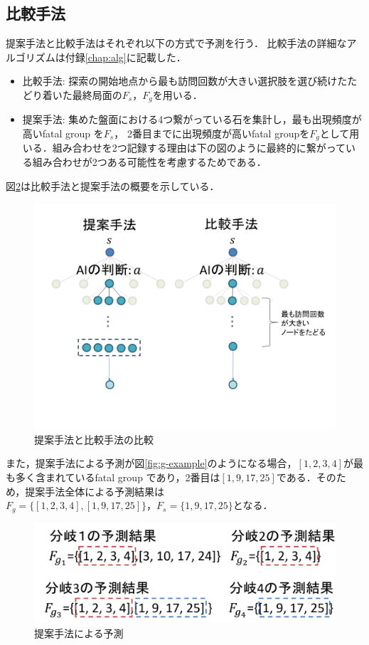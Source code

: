 \subsection{比較手法}
提案手法と比較手法はそれぞれ以下の方式で予測を行う．
比較手法の詳細なアルゴリズムは付録\ref{chap:alg}に記載した．
\newpage
\begin{itemize}
	\item 比較手法: 探索の開始地点から最も訪問回数が大きい選択肢を選び続けたたどり着いた最終局面の$F_s， F_g$を用いる．
	\item 提案手法: 集めた盤面における4つ繋がっている石を集計し，最も出現頻度が高いfatal group を$F_s$， 2番目までに出現頻度が高いfatal groupを$F_g$として用いる．組み合わせを2つ記録する理由は下の図のように最終的に繋がっている組み合わせが2つある可能性を考慮するためである．
\end{itemize}
図\ref{fig:compare}は比較手法と提案手法の概要を示している．
\begin{figure}[t]
	\centering
	\includegraphics[width=\linewidth]{./figure/compare-image.png}
	\caption{提案手法と比較手法の比較}
	\label{fig:compare}
\end{figure}
また，提案手法による予測が図\ref{fig:g-example}のようになる場合，$[1,2,3,4]$が最も多く含まれているfatal group
であり，2番目は$[1, 9, 17, 25]$である．そのため，提案手法全体による予測結果は$F_g=\{[1, 2, 3, 4], [1, 9, 17, 25]\}， F_s=\{1, 9, 17, 25\}$となる．
\begin{figure}[t]
	\centering
	\includegraphics[width=\linewidth]{./figure/g-example.png}
	\caption{提案手法による予測}
	\label{fig:compare}
\end{figure}

